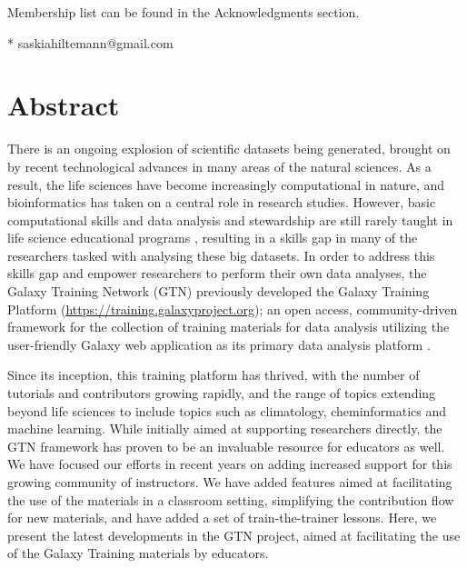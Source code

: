 \documentclass[10pt,letterpaper]{article}
\begin{document}
\begin{flushleft}


\textpilcrow Membership list can be found in the Acknowledgments section.

* saskiahiltemann@gmail.com

\end{flushleft}


\section*{Abstract}
There is an ongoing explosion of scientific datasets being generated, brought on by recent technological advances in many areas of the natural sciences.
As a result, the life sciences have become increasingly computational in nature, and bioinformatics has taken on a central role in research studies.
However, basic computational skills and data analysis and stewardship are still rarely taught in life science educational programs \cite{Attwood2019}, resulting in a skills gap in many of the researchers tasked with analysing these big datasets.
In order to address this skills gap and empower researchers to perform their own data analyses, the Galaxy Training Network (GTN) previously developed the Galaxy Training Platform (\url{https://training.galaxyproject.org}); an open access, community-driven framework for the collection of training materials for data analysis utilizing the user-friendly Galaxy web application as its primary data analysis platform \cite{Batut2018}.

Since its inception, this training platform has thrived, with the number of tutorials and contributors growing rapidly, and the range of topics extending beyond life sciences to include topics such as climatology, cheminformatics and machine learning.
While initially aimed at supporting researchers directly, the GTN framework has proven to be an invaluable resource for educators as well. We have focused our efforts in recent years on adding increased support for this growing community of instructors.
We have added features aimed at facilitating the use of the materials in a classroom setting, simplifying the contribution flow for new materials, and have added a set of train-the-trainer lessons.
Here, we present the latest developments in the GTN project, aimed at facilitating the use of the Galaxy Training materials by educators.
\end{document}

